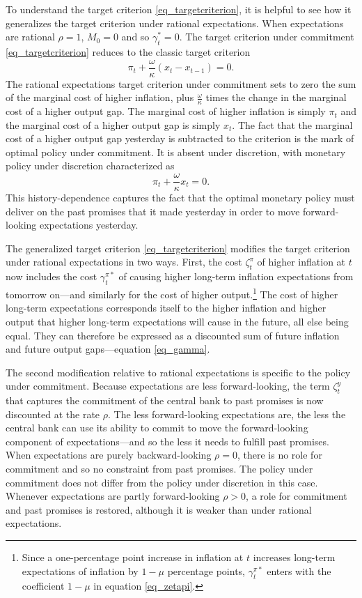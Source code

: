 \documentclass{article}
\begin{document}
To understand the target criterion \eqref{eq_targetcriterion}, it is helpful to see how it generalizes the target criterion under rational expectations. When expectations are rational $\rho=1$, $M_0=0$ and so $\gamma_t^*=0$. The target criterion under commitment \eqref{eq_targetcriterion} reduces to the classic target criterion
\begin{equation}
\pi_t + \frac{\omega}{\kappa} (x_t - x_{t-1}) = 0.\label{eq_target_re}
\end{equation}
The rational expectations target criterion under commitment sets to zero the sum of the marginal cost of higher inflation, plus $\frac{\omega}{\kappa}$ times the change in the marginal cost of a higher output gap. The marginal cost of higher inflation is simply $\pi_t$ and the marginal cost of a higher output gap is simply $x_t$. The fact that the marginal cost of a higher output gap yesterday is subtracted to the criterion is the mark of optimal policy under commitment. It is absent under discretion, with monetary policy under discretion characterized as
\begin{equation}
\pi_t + \frac{\omega}{\kappa} x_t = 0.\label{eq_target_re_discretion}
\end{equation}
This history-dependence captures the fact that the optimal monetary policy must deliver on the past promises that it made yesterday in order to move forward-looking expectations yesterday.

The generalized target criterion \eqref{eq_targetcriterion} modifies the target criterion under rational expectations in two ways. First, the cost $\zeta_t^{\pi}$ of higher inflation at $t$ now includes the cost $\gamma_t^{\pi*}$ of causing higher long-term inflation expectations from tomorrow on---and similarly for the cost of higher output.\footnote{Since a one-percentage point increase in inflation at $t$ increases long-term expectations of inflation by $1-\mu$ percentage points, $\gamma_t^{\pi*}$ enters with the coefficient $1-\mu$ in equation \eqref{eq_zetapi}.} The cost of higher long-term expectations corresponds itself to the higher inflation and higher output that higher long-term expectations will cause in the future, all else being equal. They can therefore be expressed as a discounted sum of future inflation and future output gaps---equation \eqref{eq_gamma}.

The second modification relative to rational expectations is specific to the policy under commitment. Because expectations are less forward-looking, the term $\zeta_t^y$ that captures the commitment of the central bank to past promises is now discounted at the rate $\rho$. The less forward-looking expectations are, the less the central bank can use its ability to commit to move the forward-looking component of expectations---and so the less it needs to fulfill past promises. When expectations are purely backward-looking $\rho=0$, there is no role for commitment and so no constraint from past promises. The policy under commitment does not differ from the policy under discretion in this case. Whenever expectations are partly forward-looking $\rho>0$, a role for commitment and past promises is restored, although it is weaker than under rational expectations.
\end{document}
